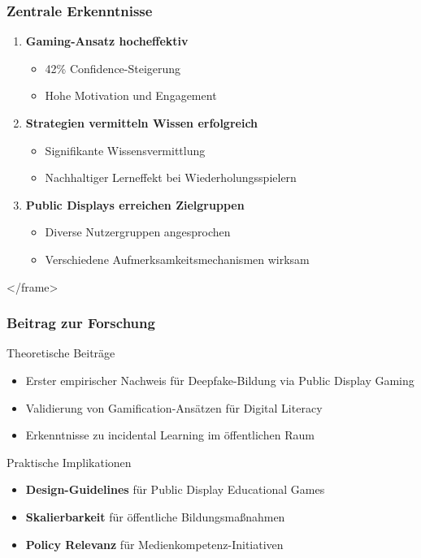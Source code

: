 \documentclass[aspectratio=169,t,xcolor=dvipsnames]{beamer}
\newcommand{\highlight}[1]{\textcolor{LMUBlue}{\textbf{#1}}}
\begin{document}
\begin{frame}
\frametitle{Zentrale Erkenntnisse}
\begin{enumerate}
\item \highlight{Gaming-Ansatz hocheffektiv}
\begin{itemize}
\item 42\% Confidence-Steigerung
\item Hohe Motivation und Engagement
\end{itemize}

\item \highlight{Strategien vermitteln Wissen erfolgreich}
\begin{itemize}
\item Signifikante Wissensvermittlung
\item Nachhaltiger Lerneffekt bei Wiederholungsspielern
\end{itemize}

\item \highlight{Public Displays erreichen Zielgruppen}
\begin{itemize}
\item Diverse Nutzergruppen angesprochen
\item Verschiedene Aufmerksamkeitsmechanismen wirksam
\end{itemize}
\end{enumerate}
</frame>

\begin{frame}
\frametitle{Beitrag zur Forschung}
\begin{block}{Theoretische Beiträge}
\begin{itemize}
\item Erster empirischer Nachweis für Deepfake-Bildung via Public Display Gaming
\item Validierung von Gamification-Ansätzen für Digital Literacy
\item Erkenntnisse zu incidental Learning im öffentlichen Raum
\end{itemize}
\end{block}

\begin{block}{Praktische Implikationen}
\begin{itemize}
\item \highlight{Design-Guidelines} für Public Display Educational Games
\item \highlight{Skalierbarkeit} für öffentliche Bildungsmaßnahmen
\item \highlight{Policy Relevanz} für Medienkompetenz-Initiativen
\end{itemize}
\end{block}
\end{frame}


\end{frame}
\end{document}

